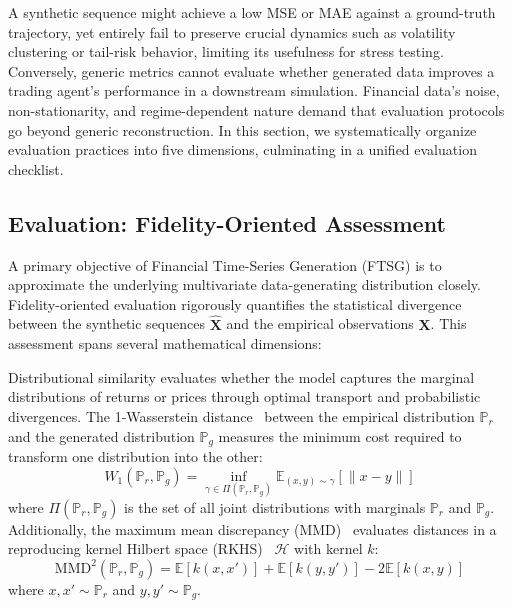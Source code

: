 \documentclass[11pt,a4paper]{article}
\begin{document}
A synthetic sequence might achieve a low MSE or MAE against a ground-truth trajectory, yet entirely fail to preserve crucial dynamics such as volatility clustering or tail-risk behavior, limiting its usefulness for stress testing. Conversely, generic metrics cannot evaluate whether generated data improves a trading agent's performance in a downstream simulation. Financial data's noise, non-stationarity, and regime-dependent nature demand that evaluation protocols go beyond generic reconstruction. In this section, we systematically organize evaluation practices into five dimensions, culminating in a unified evaluation checklist.

\subsection{Evaluation: Fidelity-Oriented Assessment}
A primary objective of Financial Time-Series Generation (FTSG) is to approximate the underlying multivariate data-generating distribution closely. Fidelity-oriented evaluation rigorously quantifies the statistical divergence between the synthetic sequences $\hat{\mathbf{X}}$ and the empirical observations $\mathbf{X}$. This assessment spans several mathematical dimensions:

Distributional similarity evaluates whether the model captures the marginal distributions of returns or prices through optimal transport and probabilistic divergences. The 1-Wasserstein distance~\citep{villani2009optimal,arjovsky2017wgan} between the empirical distribution $\mathbb{P}_r$ and the generated distribution $\mathbb{P}_g$ measures the minimum cost required to transform one distribution into the other:
    \begin{equation}
        W_1(\mathbb{P}_r, \mathbb{P}_g) = \inf_{\gamma \in \Pi(\mathbb{P}_r, \mathbb{P}_g)} \mathbb{E}_{(x,y)\sim \gamma}[\|x-y\|]
    \end{equation}
    where $\Pi(\mathbb{P}_r, \mathbb{P}_g)$ is the set of all joint distributions with marginals $\mathbb{P}_r$ and $\mathbb{P}_g$. Additionally, the maximum mean discrepancy (MMD)~\citep{gretton2012kernel} evaluates distances in a reproducing kernel Hilbert space (RKHS)~\citep{aronszajn1950theory} $\mathcal{H}$ with kernel $k$:
    \begin{equation}
        \text{MMD}^2(\mathbb{P}_r, \mathbb{P}_g) = \mathbb{E}[k(x, x')] + \mathbb{E}[k(y, y')] - 2\mathbb{E}[k(x, y)]
    \end{equation}
    where $x, x' \sim \mathbb{P}_r$ and $y, y' \sim \mathbb{P}_g$.
\end{document}
